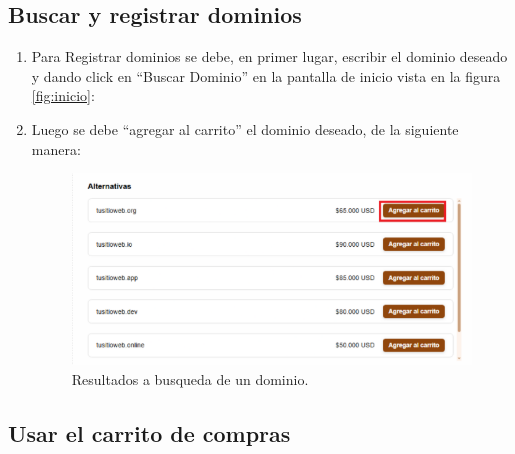 \subsection{Buscar y registrar dominios}
\begin{enumerate}
\item Para Registrar dominios se debe, en primer lugar, escribir el dominio deseado y dando click en “Buscar Dominio” en la pantalla de inicio vista en la figura \ref{fig:inicio}:

\item Luego se debe “agregar al carrito” el dominio deseado, de la siguiente manera:
    \begin{figure}[H]
        \centering
    \includegraphics[width=0.8\linewidth]{guiamodulo/domino.png}
    \caption{Resultados a busqueda de un dominio.}
    \label{fig:domino-busqueda}
    \end{figure}
\end{enumerate}

\subsection{Usar el carrito de compras}

